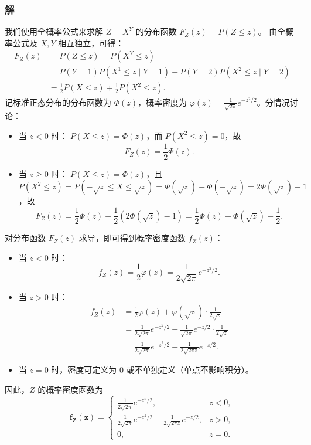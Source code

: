 \documentclass{book}
\begin{document}
\subsubsection{解}
我们使用全概率公式来求解 $Z = X^Y$ 的分布函数 $F_Z(z) = P(Z \le z)$。
由全概率公式及 $X,Y$ 相互独立，可得：
\[
\begin{aligned}
F_Z(z) &= P(Z \le z) = P(X^Y \le z) \\
&= P(Y=1)P(X^1 \le z \mid Y=1) + P(Y=2)P(X^2 \le z \mid Y=2) \\
&= \frac{1}{2}P(X \le z) + \frac{1}{2}P(X^2 \le z).
\end{aligned}
\]
记标准正态分布的分布函数为 $\Phi(z)$，概率密度为 $\varphi(z) = \frac{1}{\sqrt{2\pi}}e^{-z^2/2}$。分情况讨论：
\begin{itemize}
  \item 当 $z < 0$ 时：
    $P(X \le z) = \Phi(z)$，而 $P(X^2 \le z) = 0$，故
    \[
    F_Z(z) = \frac{1}{2}\Phi(z).
    \]
  \item 当 $z \ge 0$ 时：
    $P(X \le z) = \Phi(z)$，且 $P(X^2 \le z) = P(-\sqrt{z} \le X \le \sqrt{z}) = \Phi(\sqrt{z}) - \Phi(-\sqrt{z}) = 2\Phi(\sqrt{z}) - 1$，故
    \[
    F_Z(z) = \frac{1}{2}\Phi(z) + \frac{1}{2}\left(2\Phi(\sqrt{z}) - 1\right) = \frac{1}{2}\Phi(z) + \Phi(\sqrt{z}) - \frac{1}{2}.
    \]
\end{itemize}

对分布函数 $F_Z(z)$ 求导，即可得到概率密度函数 $f_Z(z)$：
\begin{itemize}
  \item 当 $z < 0$ 时：
    \[
    f_Z(z) = \frac{1}{2}\varphi(z) = \frac{1}{2\sqrt{2\pi}}e^{-z^2/2}.
    \]
  \item 当 $z > 0$ 时：
    \[
    \begin{aligned}
    f_Z(z) &= \frac{1}{2}\varphi(z) + \varphi(\sqrt{z}) \cdot \frac{1}{2\sqrt{z}} \\
    &= \frac{1}{2\sqrt{2\pi}}e^{-z^2/2} + \frac{1}{\sqrt{2\pi}}e^{-z/2} \cdot \frac{1}{2\sqrt{z}} \\
    &= \frac{1}{2\sqrt{2\pi}}e^{-z^2/2} + \frac{1}{2\sqrt{2\pi z}}e^{-z/2}.
    \end{aligned}
    \]
  \item 当 $z = 0$ 时，密度可定义为 $0$ 或不单独定义（单点不影响积分）。
\end{itemize}

因此，$Z$ 的概率密度函数为
\[
\boldsymbol{f_Z(z)} =
\begin{cases}
\displaystyle \frac{1}{2\sqrt{2\pi}}e^{-z^2/2}, & z < 0, \\[6pt]
\displaystyle \frac{1}{2\sqrt{2\pi}}e^{-z^2/2} + \frac{1}{2\sqrt{2\pi z}}e^{-z/2}, & z > 0, \\[6pt]
0, & z = 0.
\end{cases}
\]
\end{document}
